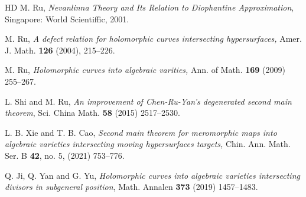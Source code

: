 \documentclass[12pt]{amsart}
\begin{document}
\begin{thebibliography}{HD}
 M. Ru, \textit{Nevanlinna Theory and Its Relation to Diophantine Approximation}, Singapore: World Scientiffic, 2001.

M. Ru, {\it A defect relation for holomorphic curves intersecting hypersurfaces,} Amer. J. Math. {\bf 126} (2004), 215--226.

 M. Ru, {\it Holomorphic curves into algebraic varities,} Ann. of Math. {\bf 169} (2009) 255--267.

 L. Shi and M. Ru, \textit{An improvement of Chen-Ru-Yan's degenerated second main theorem}, Sci. China Math. \textbf{58} (2015) 2517--2530.

  L. B. Xie and T. B. Cao, {\it Second main theorem for meromorphic maps into algebraic varieties intersecting moving hypersurfaces targets,} Chin. Ann. Math. Ser. B {\bf 42}, no. 5, (2021) 753--776.

 Q. Ji, Q. Yan and G. Yu, \textit{Holomorphic curves into algebraic varieties intersecting divisors in subgeneral position}, Math. Annalen \textbf{373} (2019) 1457--1483.

\end{thebibliography}
\end{document}
